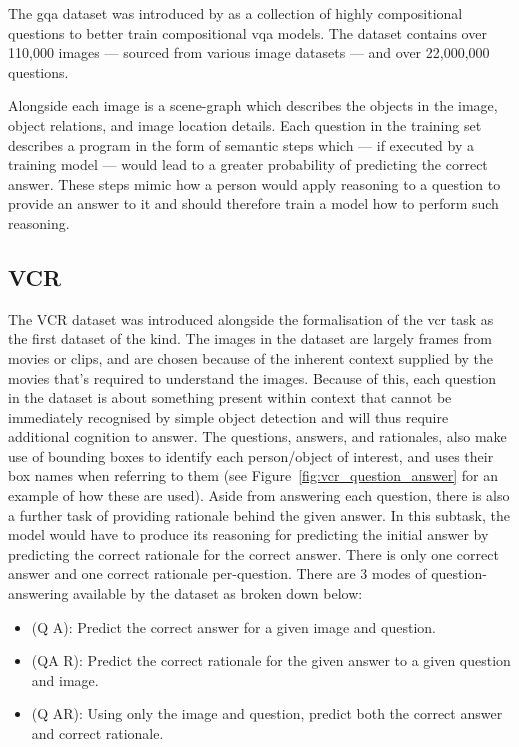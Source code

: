 The \gls{gqa} dataset was introduced by \citeauthor{hudson_gqa_2019}\cite{hudson_gqa_2019} as a collection of highly compositional questions to better train compositional \gls{vqa} models.
The dataset contains over 110,000 images --- sourced from various image datasets --- and over 22,000,000 questions.

Alongside each image is a scene-graph which describes the objects in the image, object relations, and image location details.
Each question in the training set describes a program in the form of semantic steps which --- if executed by a training model --- would lead to a greater probability of predicting the correct answer.
These steps mimic how a person would apply reasoning to a question to provide an answer to it and should therefore train a model how to perform such reasoning.

\subsection{VCR}
\label{subsec:vcr_dataset}

The VCR dataset \cite{zellers_recognition_2019} was introduced alongside the formalisation of the \gls{vcr} task as the first dataset of the kind.
The images in the dataset are largely frames from movies or clips, and are chosen because of the inherent context supplied by the movies that's required to understand the images.
Because of this, each question in the dataset is about something present within context that cannot be immediately recognised by simple object detection and will thus require additional cognition to answer.
The questions, answers, and rationales, also make use of bounding boxes to identify each person/object of interest, and uses their box names when referring to them (see Figure~\ref{fig:vcr_question_answer} for an example of how these are used).
Aside from answering each question, there is also a further task of providing rationale behind the given answer.
In this subtask, the model would have to produce its reasoning for predicting the initial answer by predicting the correct rationale for the correct answer.
There is only one correct answer and one correct rationale per-question.
There are 3 modes of question-answering available by the dataset as broken down below:

\begin{itemize}\label{list:vcr_task_types}
    \item (Q \rightarrow A): Predict the correct answer for a given image and question.
    \item (QA \rightarrow R): Predict the correct rationale for the given answer to a given question and image.
    \item (Q \rightarrow AR): Using only the image and question, predict both the correct answer and correct rationale.
\end{itemize}

